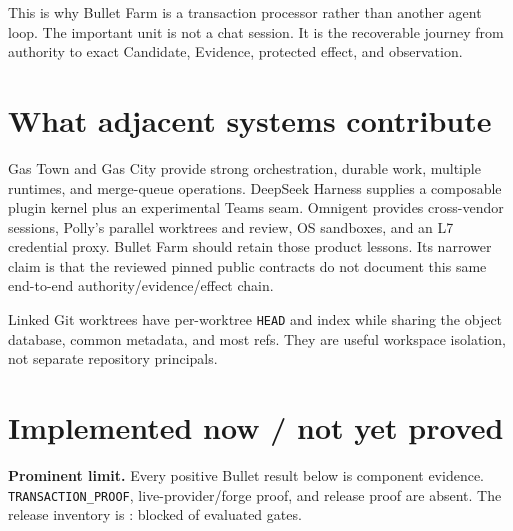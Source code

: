 \documentclass[11pt,letterpaper]{article}
\newcommand{\statusbox}[1]{\colorbox{blue!8}{\parbox{.96\linewidth}{#1}}}
\begin{document}
This is why Bullet Farm is a transaction processor rather than another agent
loop. The important unit is not a chat session. It is the recoverable journey
from authority to exact Candidate, Evidence, protected effect, and observation.

\section*{What adjacent systems contribute}

Gas Town and Gas City provide strong orchestration, durable work, multiple
runtimes, and merge-queue operations. DeepSeek Harness supplies a composable
plugin kernel plus an experimental Teams seam. Omnigent provides cross-vendor
sessions, Polly's parallel worktrees and review, OS sandboxes, and an L7
credential proxy. Bullet Farm should retain those product lessons. Its narrower
claim is that the reviewed pinned public contracts do not document this same
end-to-end authority/evidence/effect chain.

\vfill
{\small Linked Git worktrees have per-worktree \texttt{HEAD} and index while
sharing the object database, common metadata, and most refs. They are useful
workspace isolation, not separate repository principals.}

\newpage
\section*{Implemented now / not yet proved}

\statusbox{\textbf{Prominent limit.} Every positive Bullet result below is
component evidence. \texttt{TRANSACTION\_PROOF}, live-provider/forge proof,
and release proof are absent. The release inventory is
\EvidenceReleaseOutcome: \EvidenceReleaseBlocked{} blocked of
\EvidenceReleaseEvaluated{} evaluated gates.}
\end{document}
